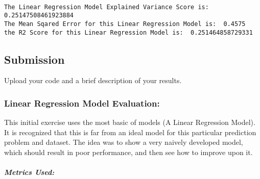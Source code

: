 \documentclass[11pt]{article}
\begin{document}
    
    \begin{center}
    \end{center}
    { \hspace*{\fill} \\}
    
    \begin{Verbatim}[commandchars=\\\{\}]
The Linear Regression Model Explained Variance Score is:  0.25147508461923884
The Mean Sqared Error for this Linear Regression Model is:  0.4575
the R2 Score for this Linear Regression Model is:  0.251464858729331
    \end{Verbatim}


    \hypertarget{submission}{%
\subsection{Submission}\label{submission}}

Upload your code and a brief description of your results.

    \hypertarget{linear-regression-model-evaluation}{%
\subsubsection{Linear Regression Model
Evaluation:}\label{linear-regression-model-evaluation}}

This initial exercise uses the most basic of models (A Linear Regression
Model). It is recognized that this is far from an ideal model for this
particular prediction problem and dataset. The idea was to show a very
naively developed model, which should result in poor performance, and
then see how to improve upon it.

\hypertarget{metrics-used}{%
\subparagraph{Metrics Used:}\label{metrics-used}}
\end{document}
